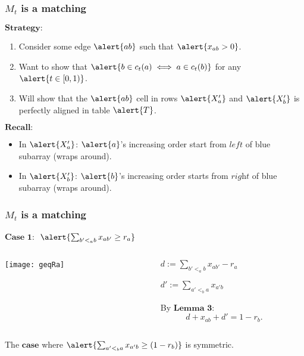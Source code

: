 \documentclass[10pt]{beamer}
\begin{document}
\begin{frame}
\frametitle{$M_t$ is a matching}
$\textbf{Strategy:}$
\begin{enumerate}
\item Consider some edge $\alert{ab}$ such that $\alert{x_{ab} > 0}$.
\item Want to show that $\alert{b \in c_t(a) \iff a \in c_t(b)}$ for any $\alert{t \in [0,1)}$.
\item Will show that the $\alert{ab}$ cell in rows $\alert{X'_a}$ and $\alert{X'_b}$ is perfectly aligned in table $\alert{T}$.
\end{enumerate}

$\textbf{Recall:}$
\begin{itemize}
\item In $\alert{X'_a}$: $\alert{a}$'s increasing order start from $\textit{left}$ of blue subarray (wraps around).
\item In $\alert{X'_b}$: $\alert{b}$'s increasing order starts from $\textit{right}$ of blue subarray (wraps around).
\end{itemize}
\end{frame}

\begin{frame}
\frametitle{$M_t$ is a matching}
$\textbf{Case 1: }$ $\alert{\sum_{b' <_a b} x_{ab'} \geq r_a}$
\begin{columns}[T] %
\begin{column}{.48\textwidth}
\texttt{[image: geqRa]}
\end{column}
\begin{column}{.48\textwidth}
$$ $$
$\quad\quad d:= \sum_{b' <_a b} x_{ab'} -r_a$

$\quad\quad d':=\sum_{a'<_b a} x_{a'b}$

$\quad\quad$By $\textbf{Lemma 3}$:
$$d + x_{ab} + d' = 1-r_b.$$
\end{column}
\end{columns}
The $\textbf{case}$ where $\alert{\sum_{a'<_b a} x_{a'b} \geq (1-r_b)}$ is symmetric.
\end{frame}
\end{document}
